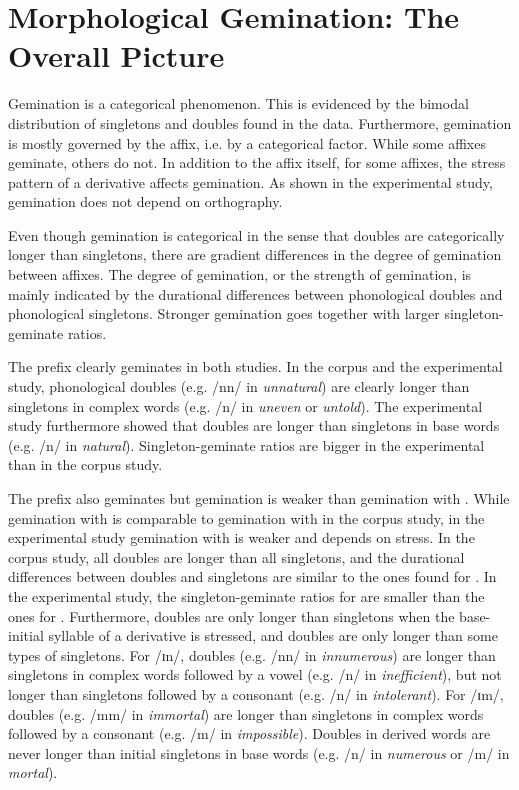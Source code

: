 \section{Morphological Gemination: The Overall Picture}

Gemination is a categorical phenomenon. This is evidenced by the bimodal distribution of singletons and doubles found in the data. Furthermore, gemination is mostly governed by the affix, i.e. by a categorical factor. While some affixes geminate, others do not. In addition to the affix itself, for some affixes, the stress pattern of a derivative affects gemination. 
As shown in the experimental study, gemination does not depend on orthography.

Even though gemination is categorical in the sense that doubles are categorically longer than singletons, there are gradient differences in the degree of gemination between affixes. The degree of gemination, or the strength of gemination, is mainly indicated by the durational differences between phonological doubles and phonological singletons. Stronger gemination goes together with larger singleton-geminate ratios. 


The prefix  clearly geminates in both studies. In the corpus and the experimental study, phonological doubles (e.g. /nn/ in \textit{unnatural}) are clearly longer than singletons in complex words (e.g. /n/ in \textit{uneven} or \textit{untold}). The experimental study furthermore showed that doubles are longer than singletons in base words  (e.g. /n/ in \textit{natural}). Singleton-geminate ratios are bigger in the experimental than in the corpus study.

The prefix  also geminates but gemination is weaker than gemination with . While gemination with  is comparable to gemination with  in the corpus study, in the experimental study gemination with  is weaker and depends on stress. 
 In the corpus study, 
 all doubles are longer than all singletons, and the durational differences between doubles and singletons are similar to the ones found for . 
In the experimental study, 
the singleton-geminate ratios for  are smaller than the ones for .
Furthermore, doubles are only longer than singletons when the base-initial syllable of a derivative is stressed, and doubles are only longer than some types of singletons. For /ɪn/, doubles (e.g. /nn/ in \textit{innumerous}) are longer than singletons in complex words followed by a vowel (e.g. /n/ in \textit{inefficient}), but not longer than singletons followed by a consonant (e.g. /n/ in \textit{intolerant}). For /ɪm/, doubles (e.g. /mm/ in \textit{immortal}) are longer than singletons in complex words followed by a consonant (e.g. /m/ in \textit{impossible}). Doubles in derived words are never longer than initial singletons in base words (e.g. /n/ in \textit{numerous} or /m/ in \textit{mortal}). 




